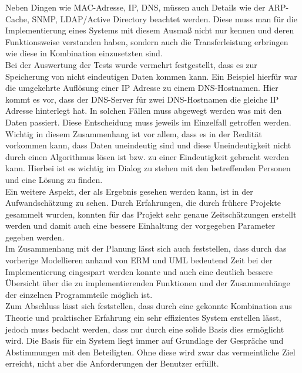 Neben Dingen wie MAC-Adresse, IP, DNS, müssen auch Details wie der ARP-Cache, SNMP, LDAP/Active Directory beachtet werden.
Diese muss man für die Implementierung eines Systems mit diesem Ausmaß nicht nur kennen und deren Funktionsweise verstanden haben, sondern auch die Transferleistung erbringen wie diese in Kombination einzusetzten sind.\\
Bei der Auswertung der Tests wurde vermehrt festgestellt, dass es zur Speicherung von nicht eindeutigen Daten kommen kann.
Ein Beispiel hierfür war die umgekehrte Auflösung einer IP Adresse zu einem DNS-Hostnamen.
Hier kommt es vor, dass der DNS-Server für zwei DNS-Hostnamen die gleiche IP Adresse hinterlegt hat.
In solchen Fällen muss abgewegt werden was mit den Daten passiert. Diese Entscheidung muss jeweils im Einzelfall getroffen werden.
Wichtig in diesem Zusammenhang ist vor allem, dass es in der Realität vorkommen kann, dass Daten uneindeutig sind und diese Uneindeutigkeit nicht durch einen Algorithmus lösen ist bzw. zu einer Eindeutigkeit gebracht werden kann.
Hierbei ist es wichtig im Dialog zu stehen mit den betreffenden Personen und eine Lösung zu finden.\\
Ein weitere Aspekt, der als Ergebnis gesehen werden kann, ist in der Aufwandschätzung zu sehen.
Durch Erfahrungen, die durch frühere Projekte gesammelt wurden, konnten für das Projekt sehr genaue Zeitschätzungen erstellt werden und damit auch eine bessere Einhaltung der vorgegeben Parameter gegeben werden.\\
Im Zusammenhang mit der Planung lässt sich auch feststellen, dass durch das vorherige Modellieren anhand von ERM und UML bedeutend Zeit bei der Implementierung eingespart werden konnte und auch eine deutlich bessere Übersicht über die zu implementierenden Funktionen und der Zusammenhänge der einzelnen Programmteile möglich ist.\\
Zum Abschluss lässt sich feststellen, dass durch eine gekonnte Kombination aus Theorie und praktischer Erfahrung ein sehr effizientes System erstellen lässt, jedoch muss bedacht werden, dass nur durch eine solide Basis dies ermöglicht wird.
Die Basis für ein System liegt immer auf Grundlage der Gespräche und Abstimmungen mit den Beteiligten. Ohne diese wird zwar das vermeintliche Ziel erreicht, nicht aber die Anforderungen der Benutzer erfüllt.